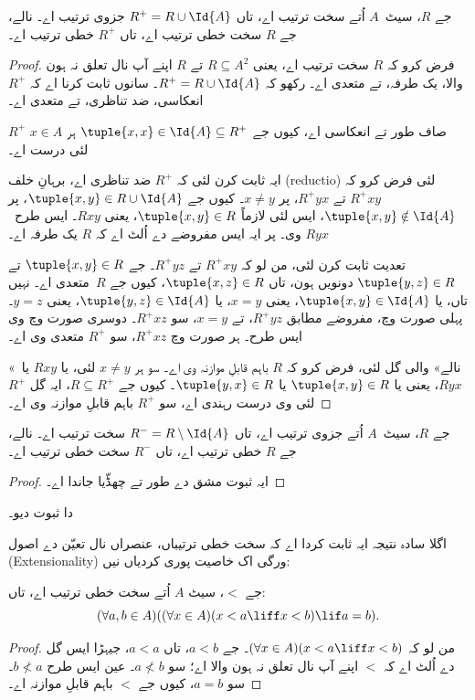 \documentclass[../../../include/open-logic-section]{subfiles}
\begin{document}
\begin{prop}
جے $R$، سیٹ~$A$ اُتے سخت ترتیب اے، تاں $R^+ = R \cup \Id{A}$ جزوی
ترتیب اے۔ نالے، جے $R$ سخت خطی ترتیب اے، تاں $R^+$ خطی ترتیب اے۔
\end{prop}

\begin{proof}
فرض کرو کہ $R$ سخت ترتیب اے، یعنی $R \subseteq A^2$ تے $R$ اپنے آپ نال
تعلق نہ ہون والا، یک طرفہ، تے متعدی اے۔ رکھو کہ $R^+ = R \cup \Id{A}$۔
سانوں ثابت کرنا اے کہ $R^+$ انعکاسی، ضد تناظری، تے متعدی اے۔

$R^+$ صاف طور تے انعکاسی اے، کیوں جے $\tuple{x, x} \in \Id{A} \subseteq
R^+$ ہر $x \in A$ لئی درست اے۔

ایہ ثابت کرن لئی کہ $R^+$ ضد تناظری اے، برہانِ خلف (reductio) لئی فرض کرو کہ $R^+xy$
تے $R^+yx$، پر $x \neq y$۔ کیوں جے $\tuple{x,y} \in R \cup \Id{A}$، پر
$\tuple{x, y} \notin \Id{A}$، ایس لئی لازماً $\tuple{x, y} \in R$، یعنی
$Rxy$۔ ایس طرح~$Ryx$ وی۔ پر ایہ ایس مفروضے دے اُلٹ اے کہ $R$ یک طرفہ اے۔

تعدیت ثابت کرن لئی، من لو کہ $R^+xy$ تے $R^+yz$۔ جے $\tuple{x, y} \in R$
تے $\tuple{y,z} \in R$ دونویں ہون، تاں $\tuple{x, z} \in R$، کیوں جے
$R$~متعدی اے۔ نہیں تاں، یا $\tuple{x, y} \in \Id{A}$، یعنی $x = y$، یا
$\tuple{y, z} \in \Id{A}$، یعنی $y = z$۔ پہلی صورت وچ، مفروضے مطابق
$R^+yz$، تے $x = y$، سو $R^+xz$۔ دوسری صورت وچ وی ایس طرح۔ ہر صورت وچ
$R^+xz$، سو $R^+$ متعدی وی اے۔

«نالے» والی گل لئی، فرض کرو کہ $R$ باہم قابلِ موازنہ وی اے۔ سو ہر
$x \neq y$ لئی، یا $Rxy$ یا~$Ryx$، یعنی یا $\tuple{x, y} \in R$ یا
$\tuple{y, x} \in R$۔ کیوں جے $R \subseteq R^+$، ایہ گل $R^+$ لئی وی
درست رہندی اے، سو $R^+$ باہم قابلِ موازنہ وی اے۔
\end{proof}

\begin{prop}
جے $R$، سیٹ~$A$ اُتے جزوی ترتیب اے، تاں $R^- = R \setminus \Id{A}$ سخت
ترتیب اے۔ نالے، جے $R$ خطی ترتیب اے، تاں $R^-$ سخت خطی ترتیب اے۔
\end{prop}

\begin{proof}
ایہ ثبوت مشق دے طور تے چھڈّیا جاندا اے۔
\end{proof}

\begin{prob}
 دا ثبوت دیو۔
\end{prob}

اگلا سادہ نتیجہ ایہ ثابت کردا اے کہ سخت خطی ترتیباں، عنصراں نال تعیّن دے اصول
(Extensionality) ورگی اک خاصیت پوری کردیاں نیں:

\begin{prop}
جے $<$، سیٹ $A$ اُتے سخت خطی ترتیب اے، تاں:
\[
  (\forall a, b \in A)((\forall x \in A)(x < a \liff x < b) \lif a = b).
\]
\end{prop}

\begin{proof}
من لو کہ $(\forall x \in A)(x < a \liff x < b)$۔ جے $a < b$، تاں
$a < a$، جیہڑا ایس گل دے اُلٹ اے کہ $<$ اپنے آپ نال تعلق نہ ہون والا
اے؛ سو $a \nless b$۔ عین ایس طرح $b \nless a$۔ سو $a = b$، کیوں جے
$<$ باہم قابلِ موازنہ اے۔
\end{proof}
\end{document}
